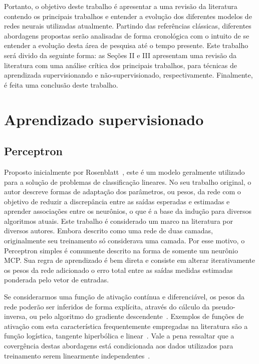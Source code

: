 \documentclass[conference]{IEEEtran}
\begin{document}
	Portanto, o objetivo deste trabalho é apresentar a uma revisão da literatura contendo os principais trabalhos e entender a evolução dos diferentes modelos de redes neurais utilizadas atualmente. Partindo das referências clássicas, diferentes abordagens propostas serão analisadas de forma cronológica com o intuito de se entender a evolução desta área de pesquisa até o tempo presente. Este trabalho será divido da seguinte forma: as Seções II e III apresentam uma revisão da literatura com uma análise crítica dos principais trabalhos, para técnicas de aprendizada supervisionando e não-supervisionado, respectivamente. Finalmente, é feita uma conclusão deste trabalho.
		
	
	\section{Aprendizado supervisionado}

	\subsection{Perceptron}
	Proposto inicialmente por Rosenblatt~\cite{rosenblatt1957perceptron}, este é um modelo geralmente utilizado para a solução de problemas de classificação lineares. No seu trabalho original, o autor descreve formas de adaptação dos parâmetros, ou pesos, da rede com o objetivo de reduzir a discrepância entre as saídas esperadas e estimadas e aprender associações entre os neurônios, o que é a base da indução para diversos algoritmos atuais. Este trabalho é considerado um marco na literatura por diversos autores. Embora descrito como uma rede de duas camadas, originalmente seu treinamento só considerava uma camada. Por esse motivo, o Perceptron simples é comumente descrito na forma de somente um neurônio MCP. Sua regra de aprendizado é bem direta e consiste em alterar iterativamente os pesos da rede adicionado o erro total entre as saídas medidas estimadas ponderada pelo vetor de entradas. 
	
	Se considerarmos uma função de ativação contínua e diferenciável, os pesos da rede poderão ser inferidos de forma explícita, através do cálculo da pseudo-inversa, ou pelo algoritmo do gradiente descendente~\cite{hertz1991introduction}. Exemplos de funções de ativação com esta característica frequentemente empregadas na literatura são a função logística, tangente hiperbólica e linear~\cite{jain1996artificial}. Vale a pena ressaltar que a covergência destas abordagens está condicionada aos dados utilizados para treinamento serem linearmente independentes~\cite{hertz1991introduction}.
	
\end{document}
